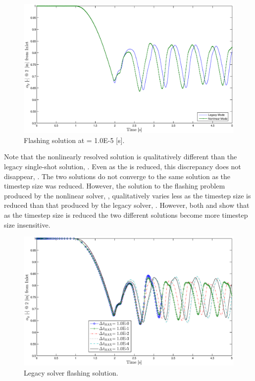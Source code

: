 \begin{figure}[h!t]
\centering
\includegraphics[width=.94\textwidth]{images/flashing_1em5.eps}
\caption{Flashing solution at \dtmax{} = 1.0E-5 {[s]}.}
\label{fig:flashing_1em5}
\end{figure}

Note that the nonlinearly resolved solution is qualitatively different than the legacy single-shot solution, .
Even as the \dtmax{} is reduced, this discrepancy does not disappear, .
The two solutions do not converge to the same solution as the timestep size was reduced.
However, the solution to the flashing problem produced by the nonlinear solver, , qualitatively varies less as the timestep size is reduced than that produced by the legacy solver, .
However, both  and  show that as the timestep size is reduced the two different solutions become more timestep size insensitive.


\begin{figure}[h!t]
\centering
\includegraphics[width=.94\textwidth]{images/cobra_flashing_al_2in.eps}
\caption{Legacy solver flashing solution.}
\label{fig:cobra_mode_flashing}
\end{figure}

